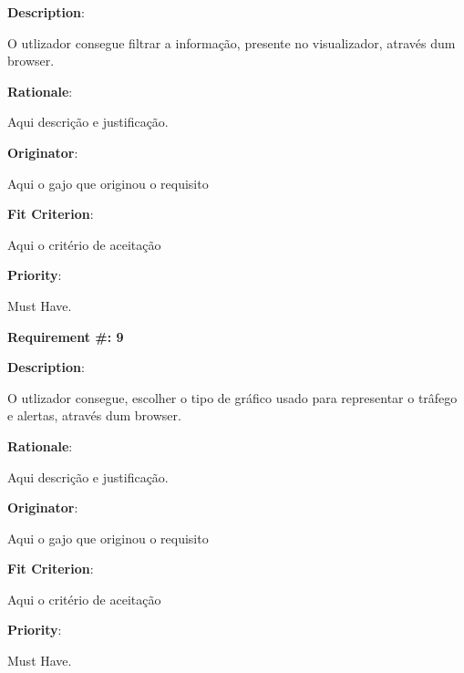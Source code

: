 \begin{description}
\item \textbf{Description}:

O utlizador consegue filtrar a informação, presente no visualizador, através dum browser.

\item \textbf{Rationale}:

Aqui descrição e justificação. \\
\item \textbf{Originator}:

Aqui o gajo que originou o requisito\\

\item \textbf{Fit Criterion}:

Aqui o critério de aceitação \\

\item \textbf{Priority}:

Must Have. \\

\end{description}

\pagebreak






\begin{minipage}{0.55\textwidth}
\begin{flushleft}\textbf{Requirement \#: 9}\end{flushleft}
\end{minipage}
\begin{minipage}{0.4\textwidth}
\end{minipage}

\begin{description}
\item \textbf{Description}:

O utlizador consegue, escolher o tipo de gráfico usado para representar o trâfego e alertas, através dum browser.

\item \textbf{Rationale}:

Aqui descrição e justificação. \\
\item \textbf{Originator}:

Aqui o gajo que originou o requisito\\

\item \textbf{Fit Criterion}:

Aqui o critério de aceitação \\

\item \textbf{Priority}:

Must Have. \\

\end{description}

